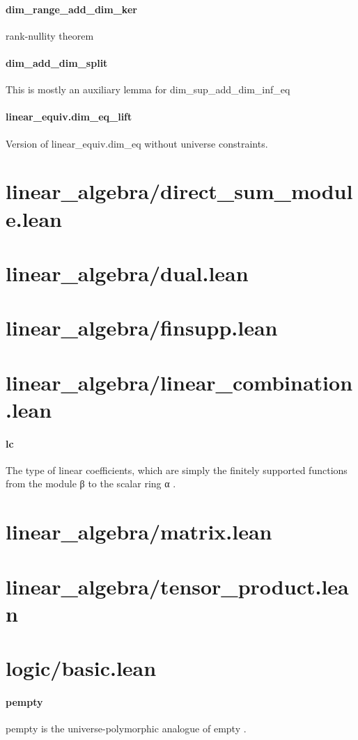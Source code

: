 \documentclass{article}
\begin{document}
\paragraph{dim\_range\_add\_dim\_ker}
\par
rank-nullity theorem
\paragraph{dim\_add\_dim\_split}
\par
This is mostly an auxiliary lemma for 
\colorbox[RGB]{253,246,227}{{{{\color[RGB]{101, 123, 131} dim\_sup\_add\_dim\_inf\_eq }}}}\paragraph{linear\_equiv.dim\_eq\_lift}
\par
Version of linear\_equiv.dim\_eq without universe constraints.
\section{linear\_algebra/direct\_sum\_module.lean}\section{linear\_algebra/dual.lean}\section{linear\_algebra/finsupp.lean}\section{linear\_algebra/linear\_combination.lean}\paragraph{lc}
\par
The type of linear coefficients, which are simply the finitely supported functions
from the module 
\colorbox[RGB]{253,246,227}{{{{\color[RGB]{101, 123, 131} β }}}} to the scalar ring 
\colorbox[RGB]{253,246,227}{{{{\color[RGB]{101, 123, 131} α }}}}.
\section{linear\_algebra/matrix.lean}\section{linear\_algebra/tensor\_product.lean}\section{logic/basic.lean}\paragraph{pempty}
\par
\colorbox[RGB]{253,246,227}{{{{\color[RGB]{101, 123, 131} pempty }}}} is the universe-polymorphic analogue of 
\colorbox[RGB]{253,246,227}{{{{\color[RGB]{101, 123, 131} empty }}}}.
\end{document}
